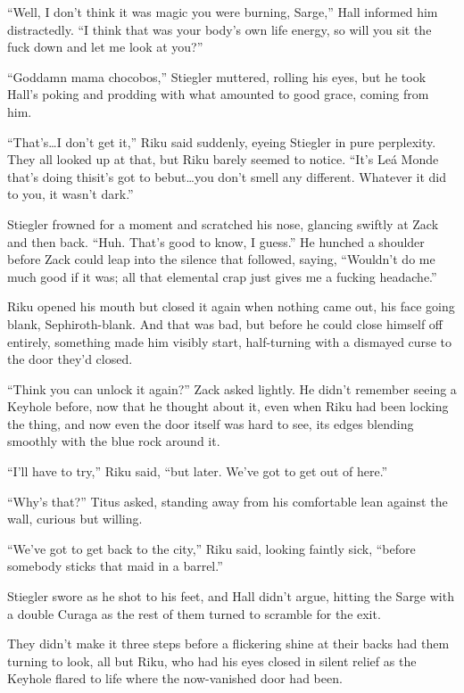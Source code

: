 ``Well, I don't think it was magic you were burning, Sarge,'' Hall informed him distractedly. ``I think that was your body's own life energy, so will you sit the fuck down and let me look at you?''

``Goddamn mama chocobos,'' Stiegler muttered, rolling his eyes, but he took Hall's poking and prodding with what amounted to good grace, coming from him.

``That's\ldots I don't get it,'' Riku said suddenly, eyeing Stiegler in pure perplexity. They all looked up at that, but Riku barely seemed to notice. ``It's Leá Monde that's doing this\textemdash it's got to be\textemdash but\ldots you don't smell any different. Whatever it did to you, it wasn't dark.''

Stiegler frowned for a moment and scratched his nose, glancing swiftly at Zack and then back. ``Huh. That's good to know, I guess.'' He hunched a shoulder before Zack could leap into the silence that followed, saying, ``Wouldn't do me much good if it was; all that elemental crap just gives me a fucking headache.''

Riku opened his mouth but closed it again when nothing came out, his face going blank, Sephiroth-blank. And that was bad, but before he could close himself off entirely, something made him visibly start, half-turning with a dismayed curse to the door they'd closed.

``Think you can unlock it again?'' Zack asked lightly. He didn't remember seeing a Keyhole before, now that he thought about it, even when Riku had been locking the thing, and now even the door itself was hard to see, its edges blending smoothly with the blue rock around it.

``I'll have to try,'' Riku said, ``but later. We've got to get out of here.''

``Why's that?'' Titus asked, standing away from his comfortable lean against the wall, curious but willing.

``We've got to get back to the city,'' Riku said, looking faintly sick, ``before somebody sticks that maid in a barrel.''

Stiegler swore as he shot to his feet, and Hall didn't argue, hitting the Sarge with a double Curaga as the rest of them turned to scramble for the exit.

They didn't make it three steps before a flickering shine at their backs had them turning to look, all but Riku, who had his eyes closed in silent relief as the Keyhole flared to life where the now-vanished door had been.

